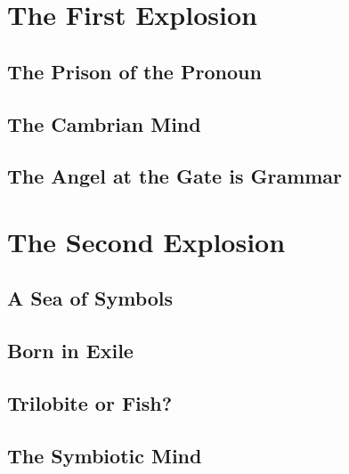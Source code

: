 \documentclass[12pt,letterpaper]{book}
\begin{document}
\part{The First Explosion}





\chapter{The Prison of the Pronoun}



\chapter{The Cambrian Mind}

\chapter{The Angel at the Gate is Grammar}

\part{The Second Explosion}

\chapter{A Sea of Symbols}

\chapter{Born in Exile}

\chapter{Trilobite or Fish?}



\chapter{The Symbiotic Mind}

\backmatter



\printbibliography
\end{document}
